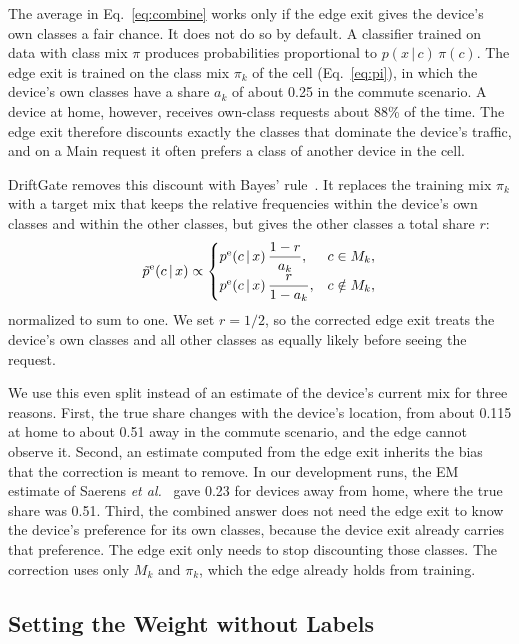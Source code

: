 The average in Eq.~\eqref{eq:combine} works only if the edge exit gives the device's own classes a fair chance. It does not do so by default. A classifier trained on data with class mix $\pi$ produces probabilities proportional to $p(x\,|\,c)\,\pi(c)$. The edge exit is trained on the class mix $\pi_k$ of the cell (Eq.~\eqref{eq:pi}), in which the device's own classes have a share $a_k$ of about 0.25 in the commute scenario. A device at home, however, receives own-class requests about 88\% of the time. The edge exit therefore discounts exactly the classes that dominate the device's traffic, and on a Main request it often prefers a class of another device in the cell.

DriftGate removes this discount with Bayes' rule~\cite{saerens2002adjusting}. It replaces the training mix $\pi_k$ with a target mix that keeps the relative frequencies within the device's own classes and within the other classes, but gives the other classes a total share $r$:
\begin{equation}
\tilde p^{\mathrm{e}}(c\,|\,x)\propto
\begin{cases}
p^{\mathrm{e}}(c\,|\,x)\,\dfrac{1-r}{a_k}, & c\in M_k,\\[2mm]
p^{\mathrm{e}}(c\,|\,x)\,\dfrac{r}{1-a_k}, & c\notin M_k,
\end{cases}
\label{eq:correct}
\end{equation}
normalized to sum to one. We set $r=1/2$, so the corrected edge exit treats the device's own classes and all other classes as equally likely before seeing the request.

We use this even split instead of an estimate of the device's current mix for three reasons. First, the true share changes with the device's location, from about 0.115 at home to about 0.51 away in the commute scenario, and the edge cannot observe it. Second, an estimate computed from the edge exit inherits the bias that the correction is meant to remove. In our development runs, the EM estimate of Saerens \emph{et al.}~\cite{saerens2002adjusting} gave 0.23 for devices away from home, where the true share was 0.51. Third, the combined answer does not need the edge exit to know the device's preference for its own classes, because the device exit already carries that preference. The edge exit only needs to stop discounting those classes. The correction uses only $M_k$ and $\pi_k$, which the edge already holds from training.

\subsection{Setting the Weight without Labels}
\label{sec:weight}

